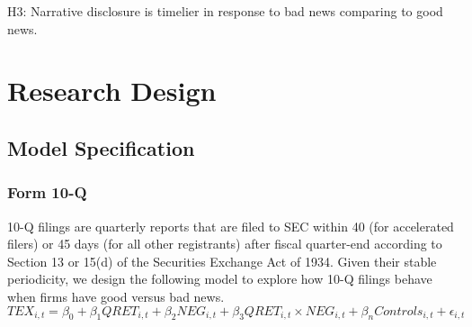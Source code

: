 \documentclass[a4paper]{article}
\begin{document}
\begin{spacing}{2}
\begin{center}
	H3: Narrative disclosure is timelier in response to bad news comparing to good news.
\end{center}

\section{Research Design}
\subsection{Model Specification}
\subsubsection{Form 10-Q}
10-Q filings are quarterly reports that are filed to SEC within 40 (for accelerated filers) or 45 days (for all other registrants) after fiscal quarter-end according to Section 13 or 15(d) of the Securities Exchange Act of 1934.  Given their stable periodicity, we design the following model to explore how 10-Q filings behave when firms have good versus bad news. 
\begin{equation} \label{eq1}
TEX_{i,t}=\beta_0+\beta_1QRET_{i,t}+\beta_2NEG_{i,t}+\beta_3QRET_{i,t}\times NEG_{i,t}+\beta_nControls_{i,t}+\epsilon_{i,t}
\end{equation}


\end{spacing}
\end{document}
